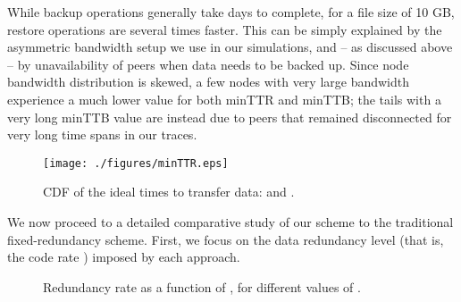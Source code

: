 While backup operations generally take days to complete, for a file
size of 10 GB, restore operations are several times faster. This can
be simply explained by the asymmetric bandwidth setup we use in our
simulations, and -- as discussed above -- by unavailability of peers
when data needs to be backed up. Since node bandwidth distribution is
skewed, a few nodes with very large bandwidth experience a much lower
value for both minTTR and minTTB; the tails with a very long minTTB
value are instead due to peers that remained disconnected for very
long time spans in our traces.

\begin{figure}
\centering
\texttt{[image: ./figures/minTTR.eps]}
\caption{CDF of the ideal times to transfer data:  and .}
\label{fig:minTTR}
\end{figure}

We now proceed to a detailed comparative study of our scheme to the traditional fixed-redundancy scheme. 
First, we focus on the data redundancy
level (that is, the code rate ) imposed by each approach.
\begin{figure}[bp]
  \centering
 \caption{Redundancy rate as a function of , for different values of .}
 \label{fig:redundancy}
\end{figure}
 

